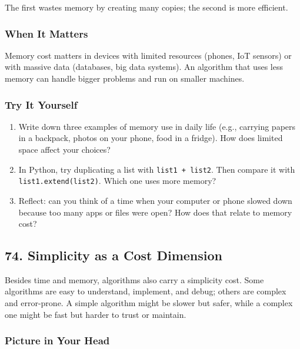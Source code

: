 \documentclass[
  letterpaper,
  DIV=11,
  numbers=noendperiod]{scrreprt}
\providecommand{\tightlist}{%
  \setlength{\itemsep}{0pt}\setlength{\parskip}{0pt}}
\begin{document}
The first wastes memory by creating many copies; the second is more
efficient.

\subsubsection{When It Matters}\label{when-it-matters-71}

Memory cost matters in devices with limited resources (phones, IoT
sensors) or with massive data (databases, big data systems). An
algorithm that uses less memory can handle bigger problems and run on
smaller machines.

\subsubsection{Try It Yourself}\label{try-it-yourself-73}

\begin{enumerate}
\def\labelenumi{\arabic{enumi}.}
\tightlist
\item
  Write down three examples of memory use in daily life (e.g., carrying
  papers in a backpack, photos on your phone, food in a fridge). How
  does limited space affect your choices?
\item
  In Python, try duplicating a list with \texttt{list1\ +\ list2}. Then
  compare it with \texttt{list1.extend(list2)}. Which one uses more
  memory?
\item
  Reflect: can you think of a time when your computer or phone slowed
  down because too many apps or files were open? How does that relate to
  memory cost?
\end{enumerate}

\subsection{74. Simplicity as a Cost
Dimension}\label{simplicity-as-a-cost-dimension}

Besides time and memory, algorithms also carry a simplicity cost. Some
algorithms are easy to understand, implement, and debug; others are
complex and error-prone. A simple algorithm might be slower but safer,
while a complex one might be fast but harder to trust or maintain.

\subsubsection{Picture in Your Head}\label{picture-in-your-head-74}
\end{document}

